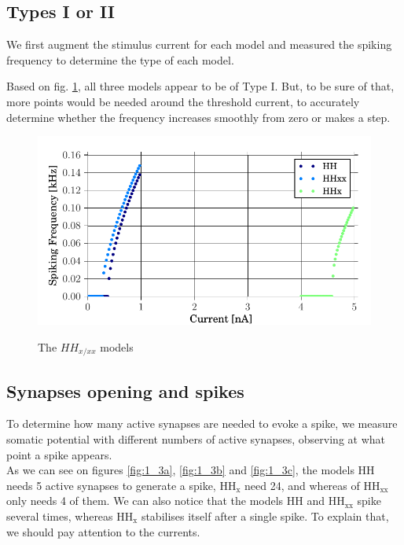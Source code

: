\documentclass[a4paper, 10pt, conference]{ieeeconf}      %
\begin{document}
\subsection{Types I or II}
We first augment the stimulus current for each model and measured the spiking frequency to determine the type of each model.

Based on fig. \ref{fig:1_2}, all three models appear to be of Type I. But, to be sure of that, more points would be needed around the threshold current, to accurately determine whether the frequency increases smoothly from zero or makes a step.


\begin{figure}
\includegraphics[width=\columnwidth]{../figures/1_2-neuron_type.pdf}
\label{fig:1_2}
\caption{The $HH_{x/xx}$ models}
\end{figure}







\subsection{Synapses opening and spikes}
To determine how many active synapses are needed to evoke a spike, we measure somatic potential with different numbers of active synapses, observing at what point a spike appears. \\

As we can see on figures \ref{fig:1_3a}, \ref{fig:1_3b} and \ref{fig:1_3c}, the models HH needs 5 active synapses to generate a spike, HH$_\text{x}$ need 24, and whereas of HH$_\text{xx}$ only needs 4 of them. We can also notice that the models HH and HH$_\text{xx}$ spike several times, whereas HH$_\text{x}$ stabilises itself after a single spike. To explain that, we should pay attention to the currents. \\
\end{document}
